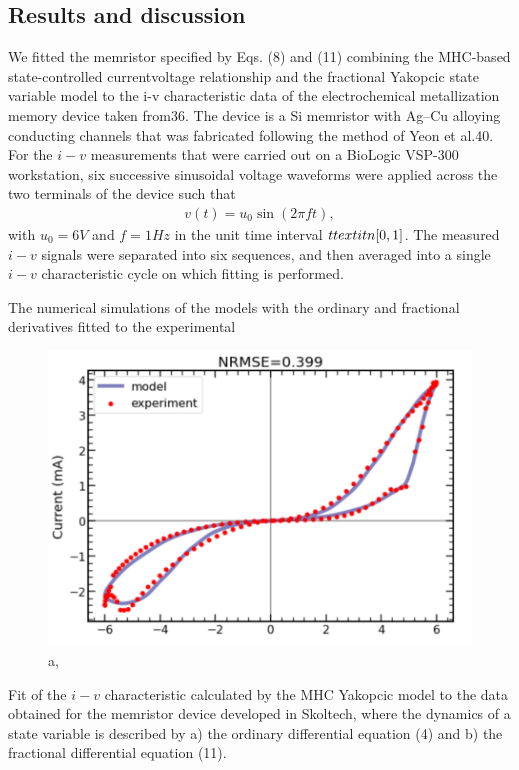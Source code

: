 \documentclass[10pt]{article}
\begin{document}
\begin{multicols}{2}
{{\section{Results and discussion}
}
We fitted the memristor specified by Eqs. (8) and (11) combining the MHC-based state-controlled currentvoltage relationship and the fractional Yakopcic state variable model to the i-v characteristic data of the electrochemical metallization memory device taken from36. The device is a Si memristor with Ag–Cu alloying conducting channels that was fabricated following the method of Yeon et al.40. For the $i-v$ measurements that were carried out on a BioLogic VSP-300 workstation, six successive sinusoidal voltage waveforms were applied across the two terminals of the device such that
\begin{align}
   v(t) = u_0 \sin(2\pi ft),
\end{align}
with $u_0 = 6 V$ and $f = 1 Hz$ in the unit time interval $t \\textit{n [0,1]}$. The measured $i-v$ signals were separated
into six sequences, and then averaged into a single $i-v$ characteristic cycle on which fitting is performed. \par
The numerical simulations of the models with the ordinary and fractional derivatives fitted to the experimental
\begin{figure}
    \includegraphics[scale=0.8]{latex_figure_a.png}
    \caption{a,}
    \label{fig:my_label}
\end{figure}
Fit of the $i-v$ characteristic calculated by the MHC Yakopcic model to the data obtained for the memristor device
developed in Skoltech, where the dynamics of a state variable
is described by a) the ordinary differential equation (4) and
b) the fractional differential equation (11).
}
\end{multicols}
\end{document}

